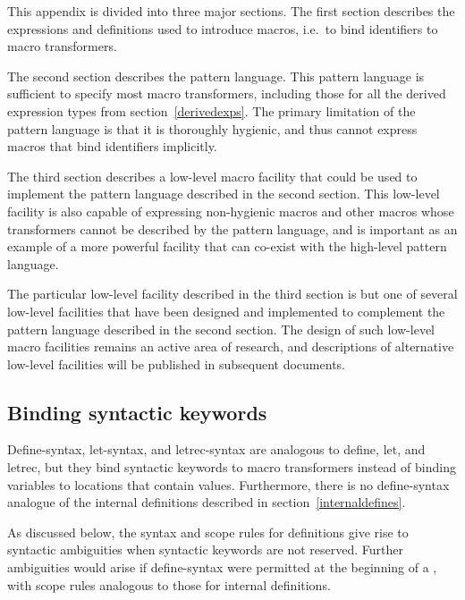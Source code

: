 
This appendix is divided into three major sections.  The first
section describes the expressions and definitions used to
introduce macros, i.e.~to bind identifiers to macro
transformers.

The second section describes the pattern language.  This pattern
language is sufficient to specify most macro transformers, including
those for all the derived expression types from
section~\ref{derivedexps}.  The primary limitation of the pattern
language is that it is thoroughly hygienic, and thus cannot express
macros that bind identifiers implicitly.

The third section describes a low-level macro facility that could be
used to implement the pattern language described in the second
section.  This low-level facility is also capable of expressing
non-hygienic macros and other macros whose transformers cannot be
described by the pattern language, and is important as an example of a
more powerful facility that can co-exist with the high-level pattern
language.

The particular low-level facility described in the third
section is but one of several low-level facilities that have been
designed and implemented to complement the pattern language described
in the second section.  The design of such low-level macro facilities
remains an active area of research, and descriptions of alternative
low-level facilities will be published in subsequent documents.


\subsection*{Binding syntactic keywords}
\label{bindsyntax}

{\cf Define-syntax}, {\cf let-syntax}, and {\cf letrec-syntax} are
analogous to {\cf define}, {\cf let}, and {\cf letrec}, but they bind
syntactic keywords to macro transformers instead of binding variables
to locations that contain values.  Furthermore, there is no {\cf
define-syntax} analogue of the internal definitions described in
section~\ref{internaldefines}.

\begin{rationale}
As discussed below, the syntax and scope rules for definitions
give rise to syntactic ambiguities when syntactic keywords are
not reserved.
Further ambiguities would arise if {\cf define-syntax}
were permitted at the beginning of a , with scope
rules analogous to those for internal definitions.
\end{rationale}

